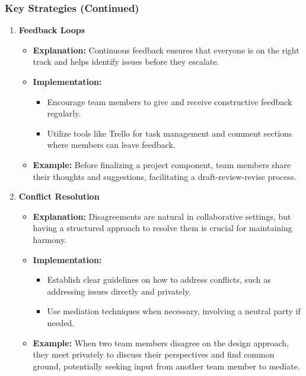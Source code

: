 \documentclass[aspectratio=169]{beamer}
\begin{document}
\begin{frame}[fragile]
    \frametitle{Key Strategies (Continued)}
    \begin{enumerate}[resume]
        \item \textbf{Feedback Loops}
        \begin{itemize}
            \item \textbf{Explanation:} Continuous feedback ensures that everyone is on the right track and helps identify issues before they escalate.
            \item \textbf{Implementation:}
            \begin{itemize}
                \item Encourage team members to give and receive constructive feedback regularly.
                \item Utilize tools like Trello for task management and comment sections where members can leave feedback.
            \end{itemize}
            \item \textbf{Example:} Before finalizing a project component, team members share their thoughts and suggestions, facilitating a draft-review-revise process.
        \end{itemize}
        \item \textbf{Conflict Resolution}
        \begin{itemize}
            \item \textbf{Explanation:} Disagreements are natural in collaborative settings, but having a structured approach to resolve them is crucial for maintaining harmony.
            \item \textbf{Implementation:}
            \begin{itemize}
                \item Establish clear guidelines on how to address conflicts, such as addressing issues directly and privately.
                \item Use mediation techniques when necessary, involving a neutral party if needed.
            \end{itemize}
            \item \textbf{Example:} When two team members disagree on the design approach, they meet privately to discuss their perspectives and find common ground, potentially seeking input from another team member to mediate.
        \end{itemize}
    \end{enumerate}
\end{frame}
\end{document}
